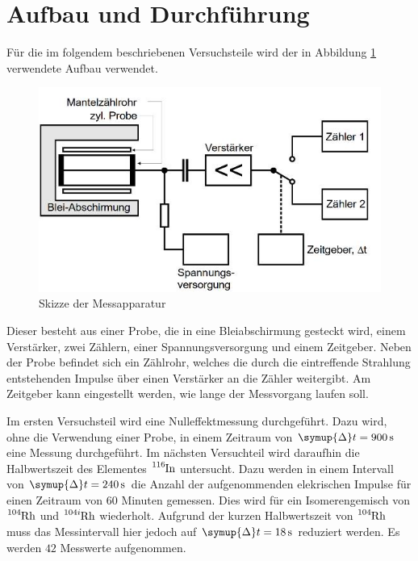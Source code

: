 \section{Aufbau und Durchführung}
\label{sec:Durchführung}
Für die im folgendem beschriebenen Versuchsteile wird der in Abbildung \ref{fig:Aufbau} verwendete Aufbau verwendet.
\begin{figure}[H]
  \centering
  \includegraphics[scale=0.7]{Text/Bilder/Aufbau.jpg}
  \caption{Skizze der Messapparatur\cite[226]{sample}}
  \label{fig:Aufbau}
\end{figure}
Dieser besteht aus einer Probe, die in eine Bleiabschirmung gesteckt wird, einem Verstärker, zwei Zählern, einer Spannungsversorgung und einem Zeitgeber.
Neben der Probe befindet sich ein Zählrohr,
welches die durch die eintreffende Strahlung entstehenden Impulse über einen Verstärker an die Zähler weitergibt.
Am Zeitgeber kann eingestellt werden, wie lange der Messvorgang laufen soll. \newline

Im ersten Versuchsteil wird eine Nulleffektmessung durchgeführt. Dazu wird, ohne die Verwendung einer Probe, in einem Zeitraum von $\symup{\Delta} t= \SI{900}{\second}$ eine Messung durchgeführt.
Im nächsten Versuchteil wird daraufhin die Halbwertszeit des Elementes $\ce{^{116}In}$ untersucht. Dazu werden in einem Intervall von $\symup{\Delta} t= \SI{240}{\second}$ die Anzahl der
aufgenommenden elekrischen Impulse für einen Zeitraum von $60$ Minuten gemessen.
Dies wird für ein Isomerengemisch von $\ce{^{104}Rh}$ und $\ce{^{104i}Rh}$ wiederholt. Aufgrund der kurzen Halbwertszeit von $\ce{^{104}Rh}$ muss das Messintervall hier jedoch auf
$\symup{\Delta} t= \SI{18}{\second}$ reduziert werden. Es werden $42$ Messwerte aufgenommen.
